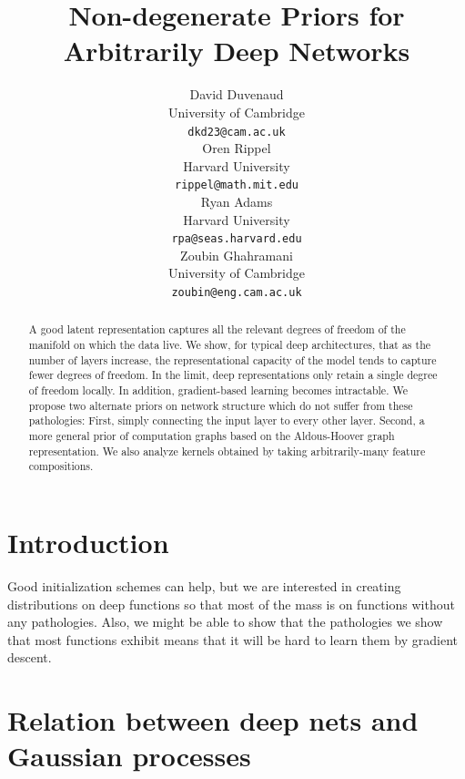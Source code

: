 \documentclass{article}
\title{Non-degenerate Priors for Arbitrarily Deep Networks}
\author{
David Duvenaud \\
University of Cambridge \\
\texttt{dkd23@cam.ac.uk} \\
\And
Oren Rippel \\
Harvard University \\
\texttt{rippel@math.mit.edu} \\
\AND
Ryan Adams \\
Harvard University \\
\texttt{rpa@seas.harvard.edu} \\
\And
Zoubin Ghahramani \\
University of Cambridge \\
\texttt{zoubin@eng.cam.ac.uk} \\
}
\begin{document}
\maketitle

\begin{abstract}
A good latent representation captures all the relevant degrees of freedom of the manifold on which the data live.  We show, for typical deep architectures, that as the number of layers increase, the representational capacity of the model tends to capture fewer degrees of freedom.  In the limit, deep representations only retain a single degree of freedom locally.  In addition, gradient-based learning becomes intractable.  We propose two alternate priors on network structure which do not suffer from these pathologies:  First, simply connecting the input layer to every other layer.  Second, a more general prior of computation graphs based on the Aldous-Hoover graph representation.  We also analyze kernels obtained by taking arbitrarily-many feature compositions.
\end{abstract}

\section{Introduction}



Good initialization schemes can help, but we are interested in creating distributions on deep functions so that most of the mass is on functions without any pathologies.  Also, we might be able to show that the pathologies we show that most functions exhibit means that it will be hard to learn them by gradient descent.

\section{Relation between deep nets and Gaussian processes}


\end{document}
